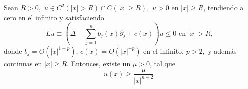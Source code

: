 




\begin{lemma}
Sean $R>0,$ $u\in C^{2}\left(  \left|  x\right|  >R\right)  \cap C\left(
\left|  x\right|  \geq R\right)  ,$ $u>0$ en $\left|  x\right|  \geq R$,
tendiendo a cero en el infinito y satisfaciendo
\[
Lu\equiv\left(  \Delta+\sum_{j=1}^{n}b_{j}\left(  x\right)  \partial
_{j}+c\left(  x\right)  \right)  u\leq0\text{ \ \ en }\left|  x\right|  >R,
\]
donde $b_{j}=O\left(  \left|  x\right|  ^{1-p}\right)  $, $c\left(  x\right)
=O\left(  \left|  x\right|  ^{-p}\right)  $ en el infinito, $p>2,$ y
adem\'{a}s continuas en $\left|  x\right|  \geq R$. Entonces, existe un
$\mu>0$, tal que
\[
u\left(  x\right)  \geq\frac{\mu}{\left|  x\right|  ^{n-2}}\text{.}%
\]

\end{lemma}

